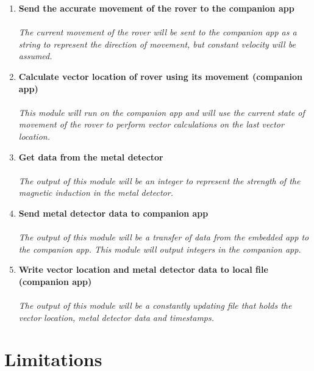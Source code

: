 \documentclass[11pt]{report}
\begin{document}
\begin{enumerate}
			\item{\textbf{Send the accurate movement of the rover to the companion app}}\\\\ \emph{The current movement of the rover will be sent to the companion app as a string to represent the direction of movement, but constant velocity will be assumed.}
			\item{\textbf{Calculate vector location of rover using its movement (companion app)}}\\\\ \emph{This module will run on the companion app and will use the current state of movement of the rover to perform vector calculations on the last vector location.}
			\item{\textbf{Get data from the metal detector}}\\\\ \emph{The output of this module will be an integer to represent the strength of the magnetic induction in the metal detector.}
			\item{\textbf{Send metal detector data to companion app}}\\\\ \emph{The output of this module will be a transfer of data from the embedded app to the companion app. This module will output integers in the companion app.}
			\item{\textbf{Write vector location and metal detector data to local file (companion app)}}\\\\ \emph{The output of this module will be a constantly updating file that holds the vector location, metal detector data and timestamps.}
		\end{enumerate}

\section{Limitations}
\end{document}
